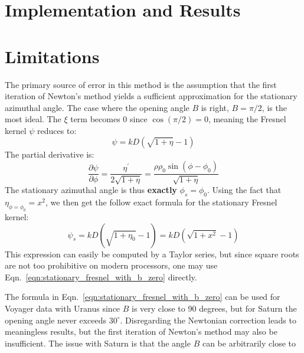 \documentclass{article}
\begin{document}
    \section{Implementation and Results}
    \section{Limitations}
        The primary source of error in this method is the assumption that
        the first iteration of Newton's method yields a sufficient
        approximation for the stationary azimuthal angle. The case where the
        opening angle $B$ is right, $B=\pi/2$, is the most ideal.
        The $\xi$ term becomes $0$ since $\cos(\pi/2)=0$, meaning the
        Fresnel kernel $\psi$ reduces to:
        \begin{equation}
            \psi=kD\left(
                \sqrt{1+\eta}-1
            \right)
        \end{equation}
        The partial derivative is:
        \begin{equation}
            \frac{\partial\psi}{\partial\phi}
            =\frac{\eta^{\prime}}{2\sqrt{1+\eta}}
            =\frac{\rho\rho_{0}\sin(\phi-\phi_{0})}{\sqrt{1+\eta}}
        \end{equation}
        The stationary azimuthal angle is thus \textbf{exactly}
        $\phi_{s}=\phi_{0}$. Using the fact that $\eta_{\phi=\phi_{0}}=x^{2}$,
        we then get the follow exact formula for the stationary Fresnel
        kernel:
        \begin{equation}
            \label{eqn:stationary_fresnel_with_b_zero}
            \psi_{s}
            =kD\left(
                \sqrt{1+\eta_{0}}-1
            \right)
            =kD(\sqrt{1+x^{2}}-1)
        \end{equation}
        This expression can easily be computed by a Taylor series, but since
        square roots are not too prohibitive on modern processors, one may
        use Eqn.~\ref{eqn:stationary_fresnel_with_b_zero} directly.
        \par\hfill\par
        The formula in Eqn.~\ref{eqn:stationary_fresnel_with_b_zero} can be
        used for Voyager data with Uranus since $B$ is very close to 90
        degrees, but for Saturn the opening angle never exceeds $30^{\circ}$.
        Disregarding the Newtonian correction leads to meaningless results, but
        the first iteration of Newton's method may also be insufficient. The
        issue with Saturn is that the angle $B$ can be arbitrarily close to
\end{document}
